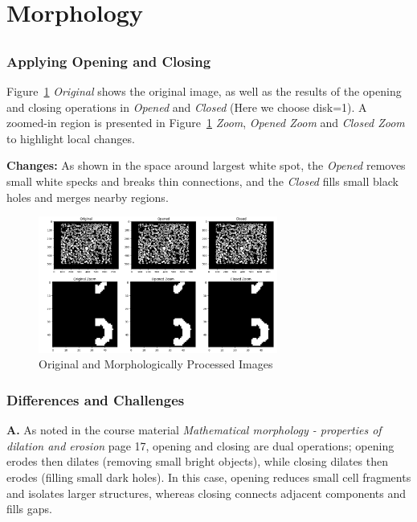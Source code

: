 \documentclass[12pt]{article}
\begin{document}
\subsection{}


\section{Morphology}
\subsection{} %

\subsubsection{Applying Opening and Closing} %

Figure~\ref{fig:full_images} \textit{Original} shows the original image, as well as the results of the opening and closing operations in \textit{Opened} and \textit{Closed} (Here we choose disk=1). A zoomed-in region is presented in Figure~\ref{fig:full_images} \textit{Zoom}, \textit{Opened Zoom} and \textit{Closed Zoom} to highlight local changes.

\textbf{Changes: } As shown in the space around largest white spot, the \textit{Opened} removes small white specks and breaks thin connections, and the \textit{Closed} fills small black holes and merges nearby regions.

\begin{figure}[ht]
    \centering
        \includegraphics[width=0.7\textwidth]{pics/a7-4.1.1}
    \caption{Original and Morphologically Processed Images}
    \label{fig:full_images}
\end{figure}


\subsubsection{Differences and Challenges} %
\textbf{A. } As noted in the course material \textit{Mathematical morphology - properties of dilation and erosion} page 17, opening and closing are dual operations; opening erodes then dilates (removing small bright objects), while closing dilates then erodes (filling small dark holes). In this case, opening reduces small cell fragments and isolates larger structures, whereas closing connects adjacent components and fills gaps.
\end{document}
